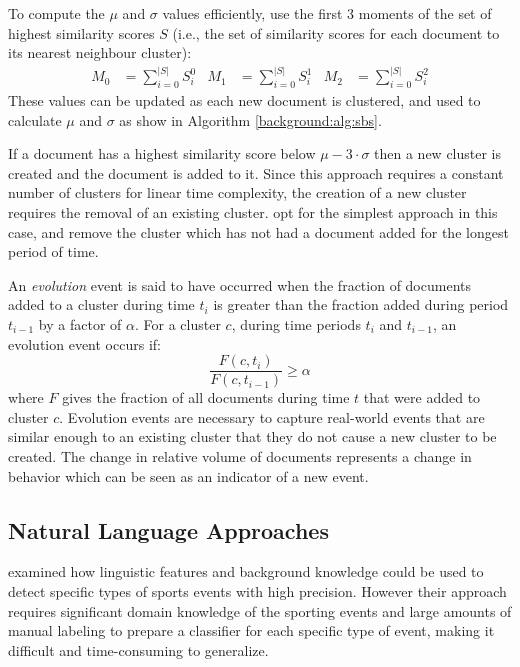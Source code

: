 To compute the $\mu$ and $\sigma$ values efficiently, \cite{Aggarwal12} use the first 3 moments of the set of highest similarity scores $S$ (i.e., the set of  similarity scores for each document to its nearest neighbour cluster):
\begin{align*}
	M_0 &= \sum_{i = 0}^{|S|}{S_i^0} & M_1 &= \sum_{i = 0}^{|S|}{S_i^1} & M_2 &= \sum_{i = 0}^{|S|}{S_{i}^2}
\end{align*}
These values can be updated as each new document is clustered, and used to calculate $\mu$ and $\sigma$ as show in Algorithm \ref{background:alg:sbs}.

If a document has a highest similarity score below $\mu - 3 \cdot \sigma$ then a new cluster is created and the document is added to it.
Since this approach requires a constant number of clusters for linear time complexity, the creation of a new cluster requires the removal of an existing cluster.
\cite{Aggarwal12} opt for the simplest approach in this case, and remove the cluster which has not had a document added for the longest period of time.

An \emph{evolution} event is said to have occurred when the fraction of documents added to a cluster during time $t_{i}$ is greater than the fraction added during period $t_{i-1}$ by a factor of $\alpha$.
For a cluster $c$, during time periods $t_i$ and $t_{i-1}$, an evolution event occurs if:
\begin{displaymath}
	\frac{F(c, t_i)}{F(c, t_{i-1})} \geq \alpha
\end{displaymath}
where $F$ gives the fraction of all documents during time $t$ that were added to cluster $c$.
Evolution events are necessary to capture real-world events that are similar enough to an existing cluster that they do not cause a new cluster to be created.
The change in relative volume of documents represents a change in behavior which can be seen as an indicator of a new event.

\subsection{Natural Language Approaches}
\cite{Choudhury11extractingsemantic} examined how linguistic features and  background knowledge could be used to detect specific types of sports events with high precision. However their approach requires significant domain knowledge of the sporting events and large amounts of manual labeling to prepare a classifier for each specific type of event, making it difficult and time-consuming to generalize.

